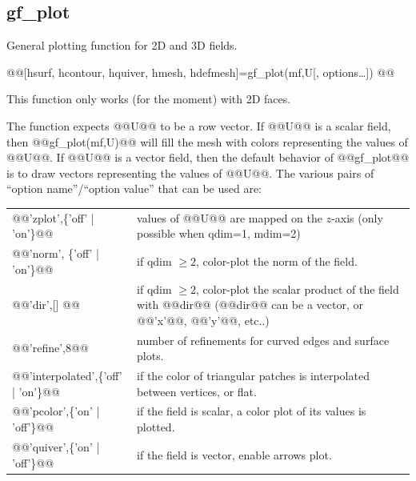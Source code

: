 \documentclass[11pt,a4paper]{article}
\newcommand{\hypertarget}[1]{\label{#1}}
\begin{document}
\subsection{gf\_plot}
\begin{purpose}
\hypertarget{gfplot}
General plotting function for 2D and 3D fields.
\end{purpose}
\begin{synopsis}
@@[hsurf, hcontour, hquiver, hmesh, hdefmesh]=gf_plot(mf,U[, options\ldots])
@@\end{synopsis}
\begin{cmddescription}
  This function only works (for the moment) with 2D faces.  
  
  The function expects @@U@@ to be a row vector. If @@U@@ is a scalar
  field, then @@gf\_plot(mf,U)@@ will fill the mesh with colors
  representing the values of @@U@@. If @@U@@ is a vector field, then
  the default behavior of @@gf_plot@@ is to draw vectors representing
  the values of @@U@@. The various pairs of ``option name''/``option
  value'' that can be used are:

\begin{center}
\begin{tabular}{|lp{}|}
  \hline
  @@'zplot',\{'off' | 'on'\}@@ &        values of @@U@@ are mapped on the $z$-axis (only possible when qdim=1, mdim=2)\\

  @@'norm', \{'off' | 'on'\}@@ &        if qdim $\geq 2$, color-plot the norm of the field.\\

  @@'dir',[] @@ &                      if qdim $\geq 2$, color-plot the scalar product of the field with @@dir@@ 
  (@@dir@@ can be a vector, or @@'x'@@, @@'y'@@, etc..)\\

  @@'refine',8@@&                      number of refinements for curved edges and surface plots.\\

  @@'interpolated',\{'off' | 'on'\}@@ & if the color of triangular patches is interpolated between vertices, or flat. \\

  @@'pcolor',\{'on' | 'off'\}@@ &       if the field is scalar, a color plot of its values is plotted.\\

  @@'quiver',\{'on' | 'off'\}@@ &       if the field is vector, enable arrows plot.\\


\end{tabular}
\end{center}
\end{cmddescription}
\end{document}
